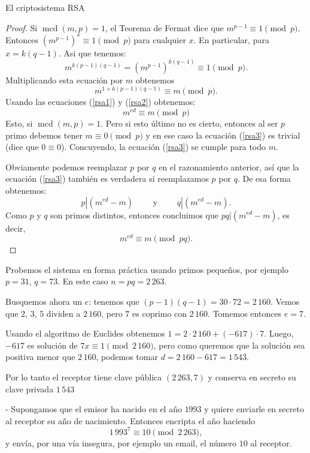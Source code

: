 \begin{section}{El criptosistema RSA}
\begin{proof}
Si $\operatorname{mcd}(m, p) = 1$, el Teorema de Fermat dice que $m^{p - 1}  \equiv 1\pmod{p}$.
Entonces $(m^{p - 1})^x \equiv 1\pmod{p}$ para cualquier $x$. En particular, para 
$x = k(q-1)$. Asi que tenemos:
\begin{equation*}
m^{k(p-1)(q-1)} = (m^{p-1})^{k(q-1)} \equiv 1\pmod{p}.
\end{equation*}
Multiplicando esta ecuación por $m$ obtenemos
\begin{equation}\label{rsa2}
m^{1+k(p-1)(q-1)} \equiv m\pmod{p}. 
\end{equation}
Usando las ecuaciones (\ref{rsa1}) y (\ref{rsa2}) obtenemos:
\begin{equation}\label{rsa3}
m^{ed} \equiv m\pmod{p} 
\end{equation}
Esto, si  $\operatorname{mcd}(m, p) = 1$. Pero si esto último no es cierto, entonces al ser $p$
primo debemos tener $m \equiv 0\pmod{p}$ y en ese caso la ecuación (\ref{rsa3}) es trivial (dice que $0 \equiv 0$). Concuyendo, la ecuación (\ref{rsa3}) se cumple para todo $m$.

Obviamente podemos reemplazar $p$ por $q$ en el razonamiento anterior, así que la ecuación (\ref{rsa3}) también es verdadera si reemplazamos $p$ por $q$. De esa forma obtenemos:
$$p|(m^{ed}-m) \qquad \text{ y } \qquad q|(m^{ed}-m).$$
Como $p$ y $q$ son primos distintos, entonces concluimos que $pq|(m^{ed}-m)$, es decir, $$m^{ed} \equiv m \pmod{pq}.$$
\end{proof}

\begin{ejemplo*} Probemos el sistema en forma práctica usando primos pequeños, por ejemplo $p=31$, $q=73$. En este caso $n = pq = 2\,263$. 

Busquemos ahora un $e$:  tenemos que $ (p-1)(q-1)= 30\cdot 72 = 2\,160$. Vemos que $2$, $3$, $5$ dividen a $2\,160$, pero $7$ es coprimo con $2\,160$. 
Tomemos entonces $e = 7$.

Usando el algoritmo de Euclides obtenemos $1 = 2\cdot 2\,160 + (-617)\cdot 7$. Luego, $-617$  es solución de $7x \equiv 1 \pmod{2\,160}$, pero como queremos que la solución sea positiva menor que $2\,160$, podemos tomar $d = 2\,160 -617 =1\,543$. 

Por lo tanto el receptor tiene clave pública $(2\,263, 7)$ y conserva en secreto  su clave privada $1\,543$

- Supongamos que el emisor ha nacido en el año $1993$ y quiere enviarle en secreto al receptor su año de nacimiento. Entonces encripta el año haciendo 
$$
1\,993^7 \equiv 10 \pmod{2\,263},
$$   
y envía, por una vía insegura, por ejemplo un email, el número $10$ al receptor.


\end{ejemplo*}
\end{section}
